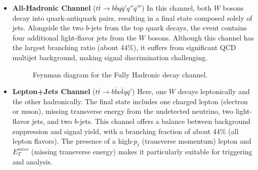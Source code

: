 \begin{itemize}
\item \textbf{All-Hadronic Channel} ($t\overline{t}\rightarrow b\overline{b}q\overline{q}'q''\overline{q}'''$) 
In this channel, both $W$ bosons decay into quark-antiquark pairs, resulting in a final state composed solely of jets. Alongside the two $b$-jets from the top quark decays, the event contains four additional light-flavor jets from the $W$ bosons. Although this channel has the largest branching ratio (about 44\%), it suffers from significant QCD multijet background, making signal discrimination challenging.

\begin{figure}[H]
    \centering
\caption{Feynman diagram for the Fully Hadronic decay channel.}
\end{figure}

\item \textbf{Lepton+Jets Channel} ($t\overline{t}\rightarrow b\overline{b} \nu \overline{l} q\overline{q}'$)
Here, one $W$ decays leptonically and the other hadronically. The final state includes one charged lepton (electron or muon), missing transverse energy from the undetected neutrino, two light-flavor jets, and two $b$-jets. This channel offers a balance between background suppression and signal yield, with a branching fraction of about 44\% (all lepton flavors). The presence of a high-$p_t$ (transverse momentum) lepton and $E^{miss}_T$ (missing transverse energy) makes it particularly suitable for triggering and analysis.


\end{itemize}
